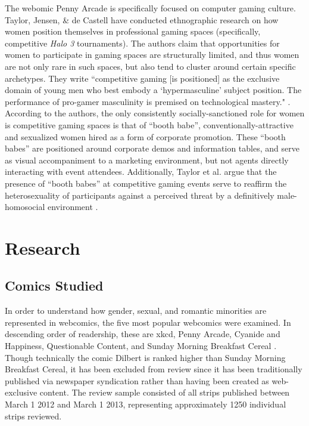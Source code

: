 \documentclass[man,12pt]{apa6}
\begin{document}
The webomic Penny Arcade is specifically focused on computer gaming culture. Taylor, Jensen, \& de Castell \citeyear{taylor2009cheerleaders} have conducted ethnographic research on how women position themselves in professional gaming spaces (specifically, competitive \emph{Halo 3} tournaments). The authors claim that opportunities for women to participate in gaming spaces are structurally limited, and thus women are not only rare in such spaces, but also tend to cluster around certain specific archetypes. They write ``competitive gaming [is positioned] as the exclusive domain of young men who best embody a `hypermasculine' subject position. The performance of pro-gamer masculinity is premised on technological mastery." \cite{taylor2009cheerleaders}. According to the authors, the only consistently socially-sanctioned role for women is competitive gaming spaces is that of ``booth babe'', conventionally-attractive and sexualized women hired as a form of corporate promotion. These ``booth babes'' are positioned around corporate demos and information tables, and serve as visual accompaniment to a marketing environment, but not agents directly interacting with event attendees. Additionally, Taylor et al. argue that the presence of ``booth babes'' at competitive gaming events serve to reaffirm the heterosexuality of participants against a perceived threat by a definitively male-homosocial environment \cite{taylor2009cheerleaders}.

\section{Research}

\subsection{Comics Studied}
In order to understand how gender, sexual, and romantic minorities are represented in webcomics, the five most popular webcomics were examined. In descending order of readership, these are xkcd, Penny Arcade, Cyanide and Happiness, Questionable Content, and Sunday Morning Breakfast Cereal \cite{alexia}. Though technically the comic Dilbert is ranked higher than Sunday Morning Breakfast Cereal, it has been excluded from review since it has been traditionally published via newspaper syndication rather than having been created as web-exclusive content. The review sample consisted of all strips published between March 1 2012 and March 1 2013, representing approximately 1250 individual strips reviewed. 
\end{document}
